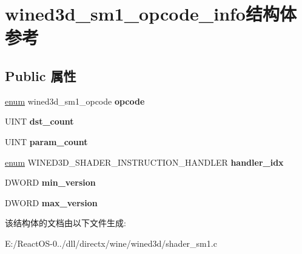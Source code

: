 \hypertarget{structwined3d__sm1__opcode__info}{}\section{wined3d\+\_\+sm1\+\_\+opcode\+\_\+info结构体 参考}
\label{structwined3d__sm1__opcode__info}
\subsection*{Public 属性}
\begin{DoxyCompactItemize}
\item 
\mbox{\label{structwined3d__sm1__opcode__info_a32e1ecd5e14619d1bafe02e9dc582777}} 
\hyperlink{interfaceenum}{enum} wined3d\+\_\+sm1\+\_\+opcode {\bfseries opcode}
\item 
\mbox{\label{structwined3d__sm1__opcode__info_a3bd94eba58754a7600fb6fbf8e741274}} 
U\+I\+NT {\bfseries dst\+\_\+count}
\item 
\mbox{\label{structwined3d__sm1__opcode__info_a4c1d26a27ef602581138f9e563129b9c}} 
U\+I\+NT {\bfseries param\+\_\+count}
\item 
\mbox{\label{structwined3d__sm1__opcode__info_a614209fd6857afd295389d29c2984723}} 
\hyperlink{interfaceenum}{enum} W\+I\+N\+E\+D3\+D\+\_\+\+S\+H\+A\+D\+E\+R\+\_\+\+I\+N\+S\+T\+R\+U\+C\+T\+I\+O\+N\+\_\+\+H\+A\+N\+D\+L\+ER {\bfseries handler\+\_\+idx}
\item 
\mbox{\label{structwined3d__sm1__opcode__info_a1549388c15376a4acff25a5974dc6c2c}} 
D\+W\+O\+RD {\bfseries min\+\_\+version}
\item 
\mbox{\label{structwined3d__sm1__opcode__info_a34a5961429ac0b6432583d0705852ebf}} 
D\+W\+O\+RD {\bfseries max\+\_\+version}
\end{DoxyCompactItemize}


该结构体的文档由以下文件生成\+:\begin{DoxyCompactItemize}
\item 
E\+:/\+React\+O\+S-\/0../dll/directx/wine/wined3d/shader\+\_\+sm1.\+c\end{DoxyCompactItemize}
